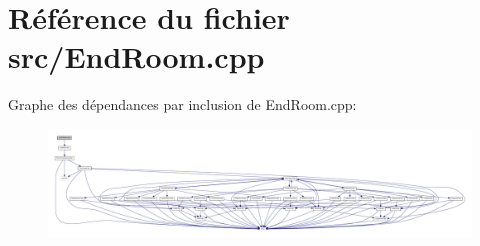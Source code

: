 \section{Référence du fichier src/\-End\-Room.cpp}
\label{_end_room_8cpp}
Graphe des dépendances par inclusion de End\-Room.\-cpp\-:\nopagebreak
\begin{figure}[H]
\begin{center}
\leavevmode
\includegraphics[width=350pt]{_end_room_8cpp__incl}
\end{center}
\end{figure}
